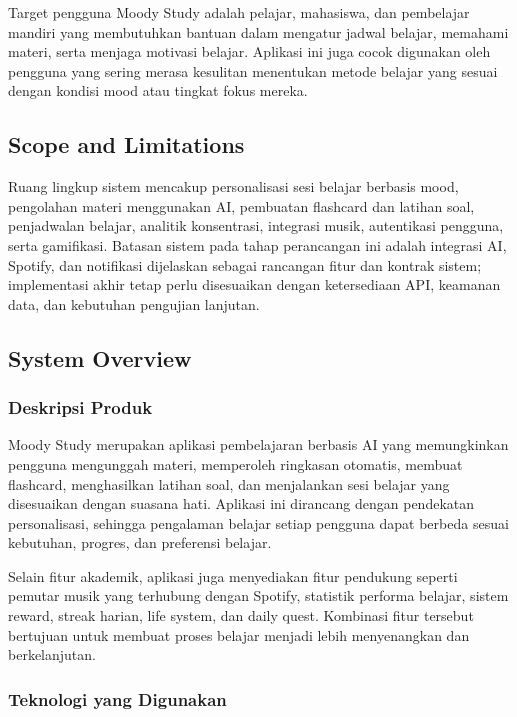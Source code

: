 \documentclass[11pt]{article}
\begin{document}
Target pengguna Moody Study adalah pelajar, mahasiswa, dan pembelajar mandiri yang membutuhkan bantuan dalam mengatur jadwal belajar, memahami materi, serta menjaga motivasi belajar. Aplikasi ini juga cocok digunakan oleh pengguna yang sering merasa kesulitan menentukan metode belajar yang sesuai dengan kondisi mood atau tingkat fokus mereka.

\subsection{Scope and Limitations}

Ruang lingkup sistem mencakup personalisasi sesi belajar berbasis mood, pengolahan materi menggunakan AI, pembuatan flashcard dan latihan soal, penjadwalan belajar, analitik konsentrasi, integrasi musik, autentikasi pengguna, serta gamifikasi. Batasan sistem pada tahap perancangan ini adalah integrasi AI, Spotify, dan notifikasi dijelaskan sebagai rancangan fitur dan kontrak sistem; implementasi akhir tetap perlu disesuaikan dengan ketersediaan API, keamanan data, dan kebutuhan pengujian lanjutan.

\subsection{System Overview}

\subsubsection{Deskripsi Produk}

Moody Study merupakan aplikasi pembelajaran berbasis AI yang memungkinkan pengguna mengunggah materi, memperoleh ringkasan otomatis, membuat flashcard, menghasilkan latihan soal, dan menjalankan sesi belajar yang disesuaikan dengan suasana hati. Aplikasi ini dirancang dengan pendekatan personalisasi, sehingga pengalaman belajar setiap pengguna dapat berbeda sesuai kebutuhan, progres, dan preferensi belajar.

Selain fitur akademik, aplikasi juga menyediakan fitur pendukung seperti pemutar musik yang terhubung dengan Spotify, statistik performa belajar, sistem reward, streak harian, life system, dan daily quest. Kombinasi fitur tersebut bertujuan untuk membuat proses belajar menjadi lebih menyenangkan dan berkelanjutan.

\subsubsection{Teknologi yang Digunakan}
\end{document}
